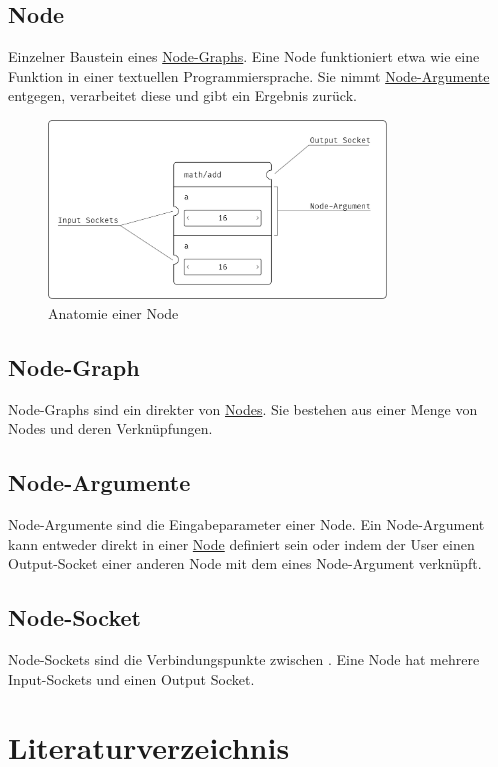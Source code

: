 \documentclass[ngerman]{article}
\begin{document}
\subsection{Node}
\label{sec:Node}
Einzelner Baustein eines \hyperref[sec:Node-Graph]{Node-Graphs}. Eine Node funktioniert etwa wie eine Funktion in einer textuellen Programmiersprache. Sie nimmt \hyperref[sec:Node-Argumente]{Node-Argumente} entgegen, verarbeitet diese und gibt ein Ergebnis zurück. 

\begin{figure}[htbp]
    \centering
    \includegraphics[width=0.8\textwidth]{graphics/NODE_ANATOMY.pdf}
    \caption{Anatomie einer Node}
    \label{sec:NODE_ANATOMY}
\end{figure}

\subsection{Node-Graph}
\label{sec:Node-Graph}
Node-Graphs sind ein direkter  von \hyperref[sec:Node]{Nodes}. Sie bestehen aus einer Menge von Nodes und deren Verknüpfungen. 

\subsection{Node-Argumente}
\label{sec:Node-Argumente}
Node-Argumente sind die Eingabeparameter einer Node. Ein Node-Argument kann entweder direkt in einer \hyperref[sec:Node]{Node} definiert sein oder indem der User einen Output-Socket einer anderen Node mit dem  eines Node-Argument verknüpft.

\subsection{Node-Socket}
\label{sec:Node-Socket}
Node-Sockets sind die Verbindungspunkte zwischen . Eine Node hat mehrere Input-Sockets und einen Output Socket.


\pagebreak
\section{Literaturverzeichnis}

\printbibliography
\end{document}
